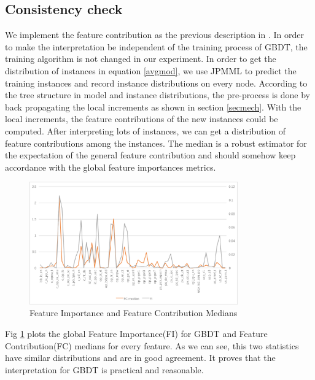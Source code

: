 \subsection{Consistency check}
We implement the feature contribution as the previous description in \cite{friedman2001greedy}. In order to make the interpretation
be independent of the training process of GBDT, the training algorithm is not changed in our experiment.
In order to get the distribution of instances in equation \ref{avgmod}, we use JPMML to predict
the training instances and record instance distributions on every node.  According to the tree structure in model and
instance distributions, the pre-process is done by back propagating the local increments  as shown in 
section \ref{secmech}. With the local increments, the feature contributions of the new instances could be computed. 
After interpreting lots of instances, we can get a distribution of feature contributions among the instances. 
The median is a robust estimator for the expectation of the general feature contribution and should somehow keep accordance with
the global feature importances metrics\cite{palczewska2013interpreting}.
\begin{figure}[htbp]
 \centering
 \includegraphics[width=0.8\textwidth]{pic/gbdtimp.png}
    \caption{Feature Importance and Feature Contribution Medians}\label{figimp}
\end{figure}

Fig \ref{figimp} plots the global Feature Importance(FI) for GBDT and Feature Contribution(FC) medians for every feature.
As we can see, this two statistics have similar distributions and are in good agreement. It proves that the
interpretation for GBDT is practical and reasonable.

